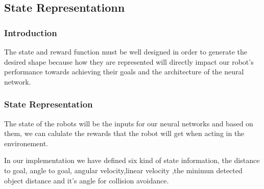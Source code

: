 \documentclass[12pt]{extarticle}
\begin{document}
\subsection{State Representationn}

\subsubsection{Introduction}
The state and reward function must be well designed in order to generate the desired shape because how they are represented will directly impact our robot's performance towards achieving their goals and the architecture of the neural network.


\subsubsection{State Representation}
The state of the robots will be  the inputs for our neural networks and  based on them, we can  calulate  the rewards that the robot will get when acting in the environement.

In our implementation we have defined six kind  of state information, the distance to goal, angle to goal, angular velocity,linear velocity ,the minimun detected object distance and it's angle for collision avoidance.
\end{document}
